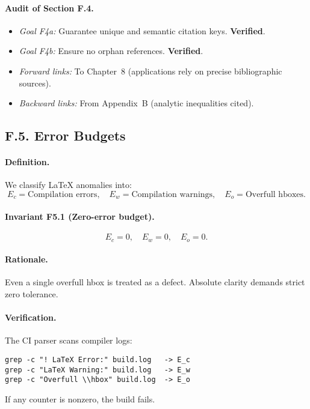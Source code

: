 \paragraph{Audit of Section F.4.}
\begin{itemize}
  \item \emph{Goal F4a:} Guarantee unique and semantic citation keys.
        \textbf{Verified}.
  \item \emph{Goal F4b:} Ensure no orphan references. \textbf{Verified}.
  \item \emph{Forward links:} To Chapter~8 (applications rely on
        precise bibliographic sources).
  \item \emph{Backward links:} From Appendix~B (analytic inequalities
        cited).
\end{itemize}

\subsection*{F.5. Error Budgets}

\paragraph{Definition.}
We classify LaTeX anomalies into:
\[
E_c = \text{Compilation errors}, \quad
E_w = \text{Compilation warnings}, \quad
E_o = \text{Overfull hboxes}.
\]

\paragraph{Invariant F5.1 (Zero-error budget).}
\[
E_c = 0, \quad E_w = 0, \quad E_o = 0.
\]

\paragraph{Rationale.}
Even a single overfull hbox is treated as a defect. Absolute clarity
demands strict zero tolerance.

\paragraph{Verification.}
The CI parser scans compiler logs:
\begin{verbatim}
grep -c "! LaTeX Error:" build.log   -> E_c
grep -c "LaTeX Warning:" build.log   -> E_w
grep -c "Overfull \\hbox" build.log  -> E_o
\end{verbatim}
If any counter is nonzero, the build fails.

